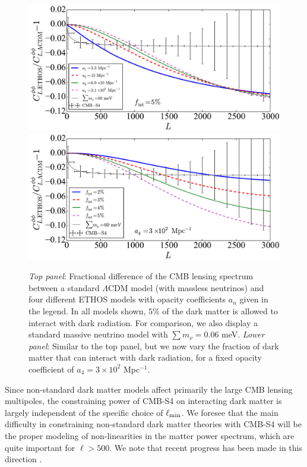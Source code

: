 %
\begin{figure}[h]
\includegraphics[width=\textwidth]{DarkEnergy/ClsPP_ETHOS_a_n.pdf}\\
\includegraphics[width=\textwidth]{DarkEnergy/ClsPP_ETHOS_f_int.pdf}
\caption{\emph{Top panel}: Fractional difference of the CMB lensing spectrum between a standard $\Lambda$CDM model (with massless neutrinos) and four different ETHOS models with opacity coefficients $a_n$ given in the legend. In all models shown, $5\%$ of the dark matter is allowed to interact with dark radiation. For comparison, we also display a standard massive neutrino model with $\sum m_\nu =0.06$ meV. \emph{Lower panel}: Similar to the top panel, but we now vary the fraction of dark matter that can interact with dark radiation, for a fixed opacity coefficient of $a_4 = 3\times 10^2$ Mpc$^{-1}$. }\label{fig:Cls_phi_PIDM}
\end{figure}
%

Since non-standard dark matter models affect primarily the large CMB lensing multipoles, the constraining power of CMB-S4 on interacting dark matter is largely independent of the specific choice of $\ell_{\rm min}$. We foresee that the main difficulty in constraining non-standard dark matter theories with CMB-S4 will be the proper modeling of non-linearities in the matter power spectrum, which are quite important for $\ell > 500$. We note that recent progress has been made in this direction \cite{Vogelsberger:2015gpr}.



%



